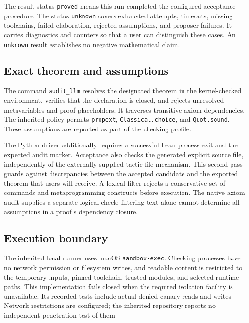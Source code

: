 \documentclass[10pt,a4paper]{article}
\newcommand{\code}[1]{\texttt{#1}}
\begin{document}
The result status \code{proved} means this run completed the configured
acceptance procedure. The status \code{unknown} covers exhausted attempts,
timeouts, missing toolchains, failed elaboration, rejected assumptions, and
proposer failures. It carries diagnostics and counters so that a user can
distinguish these cases. An \code{unknown} result establishes no negative
mathematical claim.

\subsection{Exact theorem and assumptions}
The command \code{audit\_llm} resolves the designated theorem in the
kernel-checked environment, verifies that the declaration is closed, and rejects
unresolved metavariables and proof placeholders. It traverses transitive axiom
dependencies. The inherited policy permits \code{propext},
\code{Classical.choice}, and \code{Quot.sound}. These assumptions are reported
as part of the checking profile.

The Python driver additionally requires a successful Lean process exit and the
expected audit marker. Acceptance also checks the generated explicit source
file, independently of the externally supplied tactic-file mechanism. This
second pass guards against discrepancies between the accepted candidate and
the exported theorem that users will receive. A lexical filter rejects a
conservative set of commands and metaprogramming constructs before execution.
The native axiom audit supplies a separate logical check: filtering text alone
cannot determine all assumptions in a proof's dependency closure.

\subsection{Execution boundary}
The inherited local runner uses macOS \code{sandbox-exec}. Checking processes
have no network permission or filesystem writes, and readable content is
restricted to the temporary inputs, pinned toolchain, trusted modules, and
selected runtime paths. This implementation fails closed when the required
isolation facility is unavailable. Its recorded tests include actual denied
canary reads and writes. Network restrictions are configured; the inherited
repository reports no independent penetration test of them.
\end{document}
